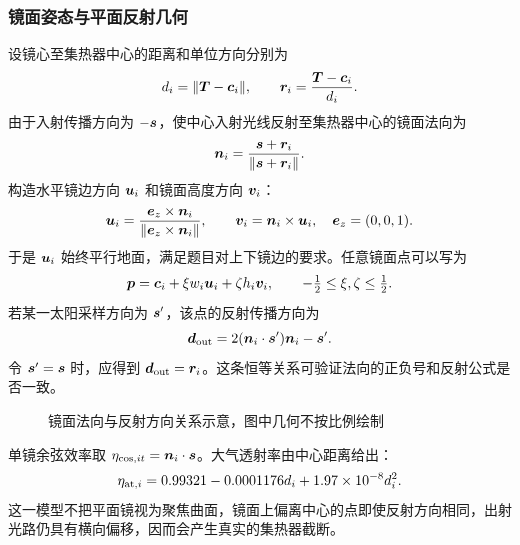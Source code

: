 \pagepart
\subsubsection{镜面姿态与平面反射几何}
设镜心至集热器中心的距离和单位方向分别为
\begin{equation}
d_i=\|\bm{T}-\bm{c}_i\|,\qquad
\bm{r}_i=\frac{\bm{T}-\bm{c}_i}{d_i}.
\end{equation}
由于入射传播方向为 $-\bm{s}$，使中心入射光线反射至集热器中心的镜面法向为
\begin{equation}\label{eq:normal}
\bm{n}_i=\frac{\bm{s}+\bm{r}_i}{\|\bm{s}+\bm{r}_i\|}.
\end{equation}
构造水平镜边方向 $\bm{u}_i$ 和镜面高度方向 $\bm{v}_i$：
\begin{equation}
\bm{u}_i=\frac{\bm{e}_z\times\bm{n}_i}{\|\bm{e}_z\times\bm{n}_i\|},
\qquad \bm{v}_i=\bm{n}_i\times\bm{u}_i,\quad \bm{e}_z=(0,0,1).
\end{equation}
于是 $\bm{u}_i$ 始终平行地面，满足题目对上下镜边的要求。任意镜面点可以写为
\begin{equation}
\bm{p}=\bm{c}_i+\xi w_i\bm{u}_i+\zeta h_i\bm{v}_i,
\qquad -\tfrac12\le\xi,\zeta\le\tfrac12.
\end{equation}
若某一太阳采样方向为 $\bm{s}'$，该点的反射传播方向为
\begin{equation}\label{eq:reflect}
\bm{d}_{\rm out}=2(\bm{n}_i\cdot\bm{s}')\bm{n}_i-\bm{s}'.
\end{equation}
令 $\bm{s}'=\bm{s}$ 时，应得到 $\bm{d}_{\rm out}=\bm{r}_i$。这条恒等关系可验证法向的正负号和反射公式是否一致。

\begin{figure}[H]\centering
{}
\caption{镜面法向与反射方向关系示意，图中几何不按比例绘制}
\end{figure}
单镜余弦效率取 $\eta_{{\rm cos},it}=\bm{n}_i\cdot\bm{s}$。大气透射率由中心距离给出：
\begin{equation}
\eta_{{\rm at},i}=0.99321-0.0001176d_i+1.97\times10^{-8}d_i^2.
\end{equation}
这一模型不把平面镜视为聚焦曲面，镜面上偏离中心的点即使反射方向相同，出射光路仍具有横向偏移，因而会产生真实的集热器截断。

